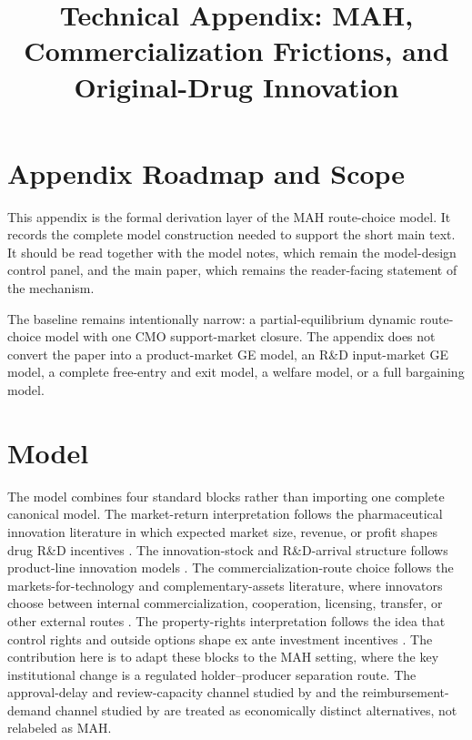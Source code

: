 \documentclass[12pt]{article}
\title{Technical Appendix: MAH, Commercialization Frictions, and Original-Drug Innovation}
\author{}
\date{}
\newcommand{\1}{\mathbf{1}}
\begin{document}
\maketitle
\thispagestyle{plain}

\newpage
\tableofcontents
\newpage

\section{Appendix Roadmap and Scope}

This appendix is the formal derivation layer of the MAH route-choice model. It records the complete model construction needed to support the short main text. It should be read together with the model notes, which remain the model-design control panel, and the main paper, which remains the reader-facing statement of the mechanism.

The baseline remains intentionally narrow: a partial-equilibrium dynamic route-choice model with one CMO support-market closure. The appendix does not convert the paper into a product-market GE model, an R\&D input-market GE model, a complete free-entry and exit model, a welfare model, or a full bargaining model.
\section{Model}

The model combines four standard blocks rather than importing one complete canonical model. The market-return interpretation follows the pharmaceutical innovation literature in which expected market size, revenue, or profit shapes drug R\&D incentives \citep{AcemogluLinn2004,DuboisDeMouzonScottMortonSeabright2015,BarwickXiaXia2026}. The innovation-stock and R\&D-arrival structure follows product-line innovation models \citep{KletteKortum2004}. The commercialization-route choice follows the markets-for-technology and complementary-assets literature, where innovators choose between internal commercialization, cooperation, licensing, transfer, or other external routes \citep{Teece1986,AroraFosfuriGambardella2001,GansStern2003}. The property-rights interpretation follows the idea that control rights and outside options shape ex ante investment incentives \citep{GrossmanHart1986,HartMoore1990}. The contribution here is to adapt these blocks to the MAH setting, where the key institutional change is a regulated holder--producer separation route. The approval-delay and review-capacity channel studied by \citet{JiaMaYangZhang2023} and the reimbursement-demand channel studied by \citet{BarwickXiaXia2026} are treated as economically distinct alternatives, not relabeled as MAH.
\end{document}
